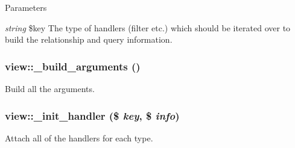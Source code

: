 \begin{DoxyParams}{Parameters}
\item[{\em string}]\$key The type of handlers (filter etc.) which should be iterated over to build the relationship and query information. \end{DoxyParams}
\hypertarget{classview_aaca007d4c1a81235098314c3b54e9277}{
\subsubsection[{\_\-build\_\-arguments}]{\setlength{\rightskip}{0pt plus 5cm}view::\_\-build\_\-arguments ()}}
\label{classview_aaca007d4c1a81235098314c3b54e9277}
Build all the arguments. \hypertarget{classview_ac63256fe2666c60445bc14aaf7a6e885}{
\subsubsection[{\_\-init\_\-handler}]{\setlength{\rightskip}{0pt plus 5cm}view::\_\-init\_\-handler (\$ {\em key}, \/  \$ {\em info})}}
\label{classview_ac63256fe2666c60445bc14aaf7a6e885}
Attach all of the handlers for each type.


